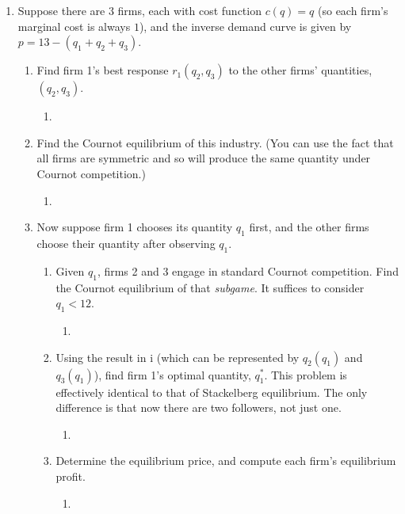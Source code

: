\documentclass[11pt]{article}
\begin{document}
\begin{enumerate}
\item Suppose there are $3$ firms, each with cost function $c(q)=q$ (so each firm's marginal cost is always $1$), and the inverse demand curve is given by $p=13-(q_{1}+q_{2}+q_{3})$.
    \begin{enumerate}
        \item Find firm 1's best response $r_{1}(q_{2},q_{3})$ to the other firms' quantities, $(q_{2},q_{3})$.
        \begin{enumerate}
            \item 
        \end{enumerate}

        \item Find the Cournot equilibrium of this industry. (You can use the fact that all firms are symmetric and so will produce the same quantity under Cournot competition.)
        \begin{enumerate}
            \item 
        \end{enumerate}

        \item Now suppose firm 1 chooses its quantity $q_{1}$ first, and the other firms choose their quantity after observing $q_{1}$.
            \begin{enumerate}
                \item Given $q_{1}$, firms 2 and 3 engage in standard Cournot competition. Find the Cournot equilibrium of that \emph{subgame}. It suffices to consider $q_{1}<12$.
                \begin{enumerate}
                    \item 
                \end{enumerate}

                \item Using the result in i (which can be represented by $q_{2}(q_{1})$ and $q_{3}(q_{1})$), find firm 1's optimal quantity, $q_{1}^{\ast}$. This problem is effectively identical to that of Stackelberg equilibrium. The only difference is that now there are two followers, not just one.
                \begin{enumerate}
                    \item 
                \end{enumerate}
                
                \item Determine the equilibrium price, and compute each firm's equilibrium profit.
                \begin{enumerate}
                    \item 
                \end{enumerate}
                

\end{enumerate}
\end{enumerate}
\end{enumerate}
\end{document}
